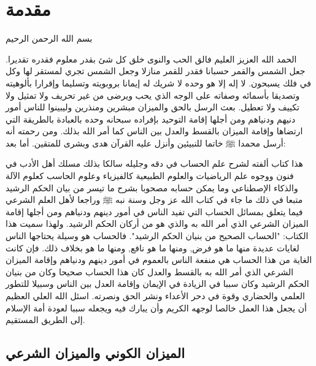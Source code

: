 \chapter{مقدمة}

\begin{center}
    بسم الله الرحمن الرحيم
\end{center}

الحمد الله العزيز العليم فالق الحب والنوى خلق كل شئ بقدر معلوم فقدره تقديرا. جعل الشمس والقمر حسبانا فقدر للقمر منازلا وجعل الشمس تجري لمستقر لها وكل في فلك يسبحون. لا إله إلا هو وحده لا شريك له  إيمانا بروبويته وتسليما وإقرارا بألوهيته وتصديقا بأسمائه وصفاته على الوجه الذي يحب ويرضى من غير تحريف ولا تمثيل ولا تكييف ولا تعطيل. بعث الرسل بالحق والميزان مبشرين ومنذرين وليبينوا للناس أمور دنيهم ودنياهم ومن أجلها إقامة التوحيد بإفراده سبحانه وحده بالعبادة بالطريقة التي ارتضاها وإقامة الميزان بالقسط والعدل بين الناس كما أمر الله بذلك. ومن رحمته أنه أرسل محمدا ﷺ خاتما للنبيئين وأنزل عليه القرآن هدى وبشرى للمتقين. أما بعد:

هذا كتاب ألفته لشرح علم الحساب في دقه وجليله سالكا بذلك مسلك أهل الأدب في فنون ووجوه علم الرياضيات والعلوم الطبيعية كالفيزياء وعلوم الحاسب كعلوم الآلة والذكاء الإصطناعي وما يمكن حسابه مصحوبا بشرح ما تيسر من بيان الحكم الرشيد متبعا في ذلك ما جاء في كتاب الله عز وجل وسنة نبه ﷺ وراجعا لأهل العلم الشرعي فيما يتعلق بمسائل الحساب التي تفيد الناس في أمور دينهم ودنياهم ومن أجلها إقامة الميزان الشرعي الذي أمر الله به والذي هو من أركان الحكم الرشيد. ولهذا سميت هذا الكتاب: "الحساب الصحيح من بنيان الحكم الرشيد". فالحساب هو وسيلة يحتاجها الناس لغايات عديدة منها ما هو فرض, ومنها ما هو نافع, ومنها ما هو بخلاف ذلك. فإن كانت الغاية من هذا الحساب هي منفعة الناس بالعموم في أمور دينهم ودنياهم وإقامة الميزان الشرعي الذي أمر الله به بالقسط والعدل كان هذا الحساب صحيحا وكان من بنيان الحكم الرشيد وكان سببا في الزيادة في الإيمان وإقامة العدل بين الناس وسبيلا للتطور العلمي والحضاري وقوة في دحر الأعداء ونشر الحق ونصرته. اسئل الله العلي العظيم أن يجعل هذا العمل خالصا لوجهه الكريم وأن يبارك فيه ويجعله سببا لعودة أمة الإسلام إلى الطريق المستقيم.

\section{الميزان الكوني والميزان الشرعي}

